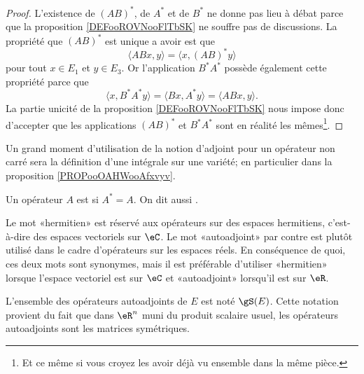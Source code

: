\begin{proof}
	L'existence de \( (AB)^*\), de \( A^*\) et de \( B^*\) ne donne pas lieu à débat parce que la proposition \ref{DEFooROVNooFlTbSK} ne souffre pas de discussions. La propriété que \( (AB)^*\) est unique a avoir est que
	\begin{equation}
		\langle ABx, y\rangle =\langle x, (AB)^*y\rangle
	\end{equation}
	pour tout \( x\in E_1\) et \( y\in E_3\). Or l'application \( B^*A^*\) possède également cette propriété parce que
	\begin{equation}
		\langle x, B^*A^*y\rangle =\langle Bx, A^*y\rangle =\langle ABx, y\rangle .
	\end{equation}
	La partie unicité de la proposition \ref{DEFooROVNooFlTbSK} nous impose donc d'accepter que les applications \( (AB)^*\) et \( B^*A^*\) sont en réalité les mêmes\footnote{Et ce même si vous croyez les avoir déjà vu ensemble dans la même pièce.}.
\end{proof}

\begin{normaltext}
	Un grand moment d'utilisation de la notion d'adjoint pour un opérateur non carré sera la définition d'une intégrale sur une variété; en particulier dans la proposition \ref{PROPooOAHWooAfxvyv}.
\end{normaltext}

\begin{definition}      \label{DEFooKEBHooWwCKRK}
	Un opérateur \( A\) est  si \( A^*=A\). On dit aussi .
\end{definition}

\begin{normaltext}
	Le mot «hermitien» est réservé aux opérateurs sur des espaces hermitiens, c'est-à-dire des espaces vectoriels sur \( \eC\). Le mot «autoadjoint» par contre est plutôt utilisé dans le cadre d'opérateurs sur les espaces réels. En conséquence de quoi, ces deux mots sont synonymes, mais il est préférable d'utiliser «hermitien» lorsque l'espace vectoriel est sur \( \eC\) et «autoadjoint» lorsqu'il est sur \( \eR\).

	L'ensemble des opérateurs autoadjoints de \( E\) est noté \( \gS(E)\). Cette notation provient du fait que dans \( \eR^n\) muni du produit scalaire usuel, les opérateurs autoadjoints sont les matrices symétriques.
\end{normaltext}

